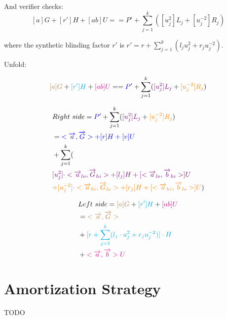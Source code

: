 \documentclass{article}
\theoremstyle{definition}
\begin{document}
And verifier checks:
$$[a]G + [r'] H + [ab] U == P' + \sum_{j=1}^k ( [u_j^2] L_j + [u_j^{-2}] R_j)$$

where the synthetic blinding factor $r'$ is $r' = r + \sum_{j=1}^k (l_j u_j^2 + r_j u_j^{-2})$.

\vspace{1cm}

Unfold:

$$
\textcolor{brown}{[a]G} + \textcolor{cyan}{[r'] H} + \textcolor{magenta}{[ab] U}
==
\textcolor{blue}{P'} + \sum_{j=1}^k ( \textcolor{violet}{[u_j^2] L_j} + \textcolor{orange}{[u_j^{-2}] R_j})
$$

\begin{align*}
&Right~side = \textcolor{blue}{P'} + \sum_{j=1}^k ( \textcolor{violet}{[u_j^2] L_j} + \textcolor{orange}{[u_j^{-2}] R_j})\\
&= \textcolor{blue}{< \overrightarrow{a}, \overrightarrow{G}> + [r] H + [v] U}\\
&+ \sum_{j=1}^k (\\
&\textcolor{violet}{[u_j^2] \cdot <\overrightarrow{a}_{lo}, \overrightarrow{G}_{hi}> + [l_j] H + [<\overrightarrow{a}_{lo}, \overrightarrow{b}_{hi}>] U}\\
&\textcolor{orange}{+ [u_j^{-2}] \cdot <\overrightarrow{a}_{hi}, \overrightarrow{G}_{lo}> + [r_j] H + [<\overrightarrow{a}_{hi}, \overrightarrow{b}_{lo}>] U}
)
\end{align*}

\begin{align*}
&Left~side = \textcolor{brown}{[a]G} + \textcolor{cyan}{[r'] H} + \textcolor{magenta}{[ab] U}\\
& = \textcolor{brown}{< \overrightarrow{a}, \overrightarrow{G} >}\\
&+ \textcolor{cyan}{[r + \sum_{j=1}^k (l_j \cdot u_j^2 + r_j u_j^{-2})] \cdot H}\\
&+ \textcolor{magenta}{< \overrightarrow{a}, \overrightarrow{b} > U}
\end{align*}


\section{Amortization Strategy}
TODO



\end{document}

